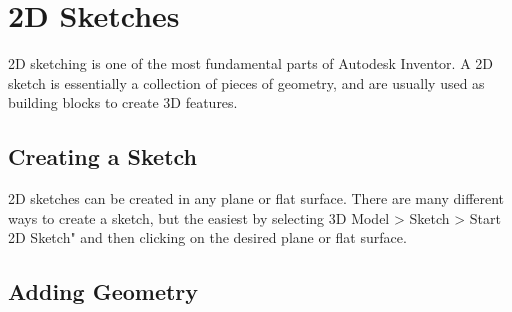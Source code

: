 \section{2D Sketches}

2D sketching is one of the most fundamental parts of Autodesk Inventor. A 2D sketch is essentially a collection of pieces of geometry, and are usually used as building blocks to create 3D features.

\subsection{Creating a Sketch}

2D sketches can be created in any plane or flat surface. There are many different ways to create a sketch, but the easiest by selecting 3D Model > Sketch > Start 2D Sketch" and then clicking on the desired plane or flat surface.

\subsection{Adding Geometry}

$ $

